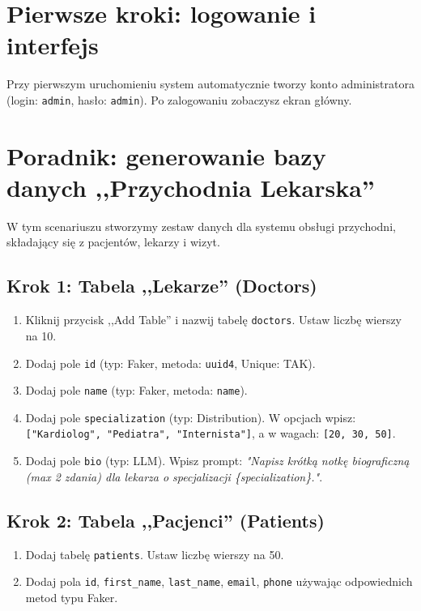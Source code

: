 \section*{Pierwsze kroki: logowanie i interfejs}
Przy pierwszym uruchomieniu system automatycznie tworzy konto administratora (login: \texttt{admin}, hasło: \texttt{admin}). Po zalogowaniu zobaczysz ekran główny.

\section*{Poradnik: generowanie bazy danych ,,Przychodnia Lekarska''}
W tym scenariuszu stworzymy zestaw danych dla systemu obsługi przychodni, składający się z pacjentów, lekarzy i wizyt.

\subsection*{Krok 1: Tabela ,,Lekarze'' (Doctors)}
\begin{enumerate}
    \item Kliknij przycisk ,,Add Table'' i nazwij tabelę \texttt{doctors}. Ustaw liczbę wierszy na 10.
    \item Dodaj pole \texttt{id} (typ: Faker, metoda: \texttt{uuid4}, Unique: TAK).
    \item Dodaj pole \texttt{name} (typ: Faker, metoda: \texttt{name}).
    \item Dodaj pole \texttt{specialization} (typ: Distribution). W opcjach wpisz: \texttt{["Kardiolog", "Pediatra", "Internista"]}, a w wagach: \texttt{[20, 30, 50]}.
    \item Dodaj pole \texttt{bio} (typ: \gls{LLM}). Wpisz prompt: \emph{"Napisz krótką notkę biograficzną (max 2 zdania) dla lekarza o specjalizacji \{specialization\}."}.
\end{enumerate}

\subsection*{Krok 2: Tabela ,,Pacjenci'' (Patients)}
\begin{enumerate}
    \item Dodaj tabelę \texttt{patients}. Ustaw liczbę wierszy na 50.
    \item Dodaj pola \texttt{id}, \texttt{first\_name}, \texttt{last\_name}, \texttt{email}, \texttt{phone} używając odpowiednich metod typu Faker.
\end{enumerate}

